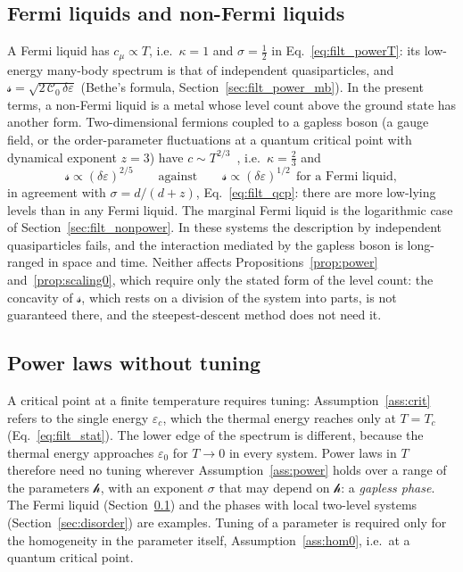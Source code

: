 \documentclass[10pt,a4paper]{article}
\theoremstyle{plain}
\newcommand{\hfield}{\mathscr{h}}  %
\newcommand{\lds}{\mathscr{s}}  %
\begin{document}
\subsection{Fermi liquids and non-Fermi liquids}
\label{sec:nfl}
A Fermi liquid has $c_\mu\propto T$, i.e.\ $\kappa=1$ and $\sigma=\tfrac12$ in
Eq.~\eqref{eq:filt_powerT}: its low-energy many-body spectrum is that of
independent quasiparticles, and
$\lds=\sqrt{2\,\mathcal C_0\,\delta\varepsilon}$ (Bethe's formula,
Section~\ref{sec:filt_power_mb}). In the present terms, a non-Fermi liquid
is a metal whose level count above the ground state has another form.
Two-dimensional fermions coupled to a gapless boson (a gauge field, or the
order-parameter fluctuations at a quantum critical point with dynamical
exponent $z=3$) have $c\sim T^{2/3}$~\cite{HLR1993,Lohneysen2007}, i.e.\
$\kappa=\tfrac23$ and
\[
  \lds\propto(\delta\varepsilon)^{2/5}
  \qquad\text{against}\qquad
  \lds\propto(\delta\varepsilon)^{1/2}\ \ \text{for a Fermi liquid} ,
\]
in agreement with $\sigma=d/(d+z)$, Eq.~\eqref{eq:filt_qcp}: there are more
low-lying levels than in any Fermi liquid. The marginal Fermi liquid is the
logarithmic case of Section~\ref{sec:filt_nonpower}. In these systems the
description by independent quasiparticles fails, and the interaction
mediated by the gapless boson is long-ranged in space and time. Neither
affects Propositions~\ref{prop:power} and~\ref{prop:scaling0}, which require
only the stated form of the level count: the concavity of $\lds$, which
rests on a division of the system into parts, is not guaranteed there, and
the steepest-descent method does not need it.

\subsection{Power laws without tuning}
\label{sec:soc}

A critical point at a finite temperature requires tuning:
Assumption~\ref{ass:crit} refers to the single energy $\varepsilon_c$, which
the thermal energy reaches only at $T=T_c$ (Eq.~\eqref{eq:filt_stat}). The
lower edge of the spectrum is different, because the thermal energy
approaches $\varepsilon_0$ for $T\to0$ in every system. Power laws in $T$
therefore need no tuning wherever Assumption~\ref{ass:power} holds over a
range of the parameters $\hfield$, with an exponent $\sigma$ that may depend
on $\hfield$: a \emph{gapless phase}. The Fermi liquid
(Section~\ref{sec:nfl}) and the phases with local two-level systems
(Section~\ref{sec:disorder}) are examples. Tuning of a parameter is required
only for the homogeneity in the parameter itself, Assumption~\ref{ass:hom0},
i.e.\ at a quantum critical point.
\end{document}
